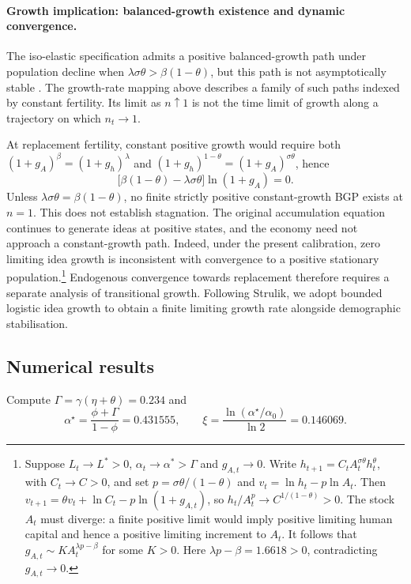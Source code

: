 \documentclass[11pt]{article}
\begin{document}
\paragraph{Growth implication: balanced-growth existence and dynamic convergence.}
The iso-elastic specification admits a positive balanced-growth path under population decline when
$\lambda\sigma\theta>\beta(1-\theta)$, but this path is not asymptotically stable
\citep[Sections~2.4--2.5]{STRULIK2024104943}. The growth-rate mapping above describes a family
of such paths indexed by constant fertility. Its limit as $n\uparrow1$ is not the time limit of
growth along a trajectory on which $n_t\to1$.

At replacement fertility, constant positive growth would require both
$(1+g_A)^\beta=(1+g_h)^\lambda$ and
$(1+g_h)^{1-\theta}=(1+g_A)^{\sigma\theta}$, hence
\[
\big[\beta(1-\theta)-\lambda\sigma\theta\big]\ln(1+g_A)=0.
\]
Unless $\lambda\sigma\theta=\beta(1-\theta)$, no finite strictly positive constant-growth BGP
exists at $n=1$. This does not establish stagnation. The original accumulation equation continues
to generate ideas at positive states, and the economy need not approach a constant-growth path.
Indeed, under the present calibration, zero limiting idea growth is inconsistent with convergence
to a positive stationary population.\footnote{Suppose $L_t\to L^\ast>0$,
$\alpha_t\to\alpha^\ast>\Gamma$ and $g_{A,t}\to0$. Write
$h_{t+1}=C_t A_t^{\sigma\theta}h_t^\theta$, with $C_t\to C>0$, and set
$p=\sigma\theta/(1-\theta)$ and $v_t=\ln h_t-p\ln A_t$. Then
$v_{t+1}=\theta v_t+\ln C_t-p\ln(1+g_{A,t})$, so
$h_t/A_t^p\to C^{1/(1-\theta)}>0$. The stock $A_t$ must diverge: a finite positive limit
would imply positive limiting human capital and hence a positive limiting increment to $A_t$.
It follows that $g_{A,t}\sim K A_t^{\lambda p-\beta}$ for some $K>0$.
Here $\lambda p-\beta=1.6618>0$, contradicting $g_{A,t}\to0$.}
Endogenous convergence towards replacement therefore requires a separate analysis of transitional
growth. Following Strulik, we adopt bounded logistic idea growth to obtain a finite limiting
growth rate alongside demographic stabilisation.

\subsection{Numerical results}
Compute $\Gamma=\gamma(\eta+\theta)=0.234$ and
\[
\alpha^\star=\frac{\phi+\Gamma}{1-\phi}=0.431555,\qquad
\xi=\frac{\ln(\alpha^\star/\alpha_0)}{\ln 2}=0.146069.
\]
\end{document}
